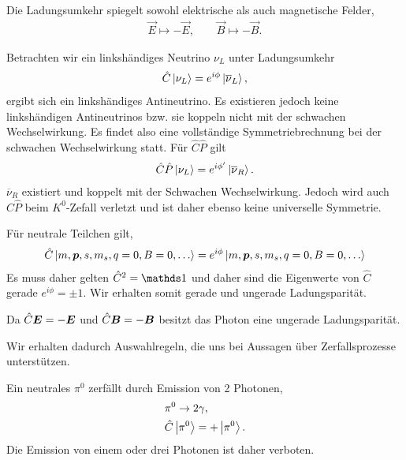 Die Ladungsumkehr spiegelt sowohl elektrische als auch magnetische Felder,
\begin{align*}
\vec{E}\mapsto -\vec{E},\qquad \vec{B} \mapsto -\vec{B}.
\end{align*}

\begin{bspn}
Betrachten wir ein linkshändiges Neutrino $\nu_L$ unter Ladungsumkehr
\begin{align*}
\hat{C}\left|\nu_L\right\rangle = e^{i\phi}\left|\overline{\nu}_L\right\rangle, 
\end{align*}
ergibt sich ein linkshändiges Antineutrino. Es existieren jedoch keine
linkshändigen Antineutrinos bzw. sie koppeln nicht mit der schwachen
Wechselwirkung. Es findet also eine vollständige Symmetriebrechnung bei der
schwachen Wechselwirkung statt. Für $\hat{C}\hat{P}$ gilt
\begin{align*}
\hat{C}\hat{P}\left|\nu_L\right\rangle = e^{i\phi'}\left|\overline{\nu}_R\right\rangle.
\end{align*}
$\overline{\nu}_R$ existiert und koppelt mit der Schwachen Wechselwirkung.
Jedoch wird auch  $\hat{C}\hat{P}$ beim $K^0$-Zefall verletzt und ist
daher ebenso keine universelle Symmetrie.\bsphere
\end{bspn}

Für neutrale Teilchen gilt,
\begin{align*}
\hat{C}\left|m,\bm{p},s,m_s,q=0,B=0,\ldots\right\rangle =
e^{i\phi}\left|m,\bm{p},s,m_s,q=0,B=0,\ldots\right\rangle
\end{align*}
Es muss daher gelten $\hat{C}^2 = \Id$ und daher sind die Eigenwerte von
$\hat{C}$ gerade $e^{i\phi}=\pm 1$. Wir erhalten somit gerade und
ungerade Ladungsparität.
\begin{bspn}
Da $\hat{\boldmath{C}}\bm{E} = -\bm{E}$ und $\hat{\boldmath{C}}\bm{B} = -\bm{B}$ besitzt
das Photon eine ungerade Ladungsparität.\bsphere
\end{bspn}
Wir erhalten dadurch Auswahlregeln, die uns bei Aussagen über Zerfallsprozesse
unterstützen.
\begin{bspn}
Ein neutrales $\pi^0$ zerfällt durch Emission von 2 Photonen,
\begin{align*}
&\pi^0 \to 2\gamma,\\
&\hat{C}\left|\pi^0\right\rangle = +\left|\pi^0\right\rangle.
\end{align*}
Die Emission von einem oder drei Photonen ist daher verboten.\bsphere
\end{bspn}

